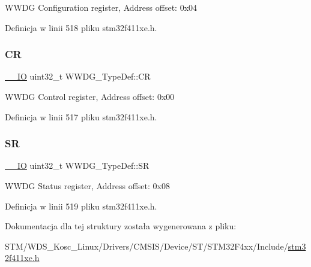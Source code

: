 W\+W\+DG Configuration register, Address offset\+: 0x04 

Definicja w linii 518 pliku stm32f411xe.\+h.

\mbox{\label{struct_w_w_d_g___type_def_a4caf530d45f7428c9700d9c0057135f8}} 
\subsubsection{\texorpdfstring{CR}{CR}}
{\footnotesize\ttfamily \hyperlink{core__sc300_8h_aec43007d9998a0a0e01faede4133d6be}{\+\_\+\+\_\+\+IO} uint32\+\_\+t W\+W\+D\+G\+\_\+\+Type\+Def\+::\+CR}

W\+W\+DG Control register, Address offset\+: 0x00 

Definicja w linii 517 pliku stm32f411xe.\+h.

\mbox{\label{struct_w_w_d_g___type_def_a15655cda4854cc794db1f27b3c0bba38}} 
\subsubsection{\texorpdfstring{SR}{SR}}
{\footnotesize\ttfamily \hyperlink{core__sc300_8h_aec43007d9998a0a0e01faede4133d6be}{\+\_\+\+\_\+\+IO} uint32\+\_\+t W\+W\+D\+G\+\_\+\+Type\+Def\+::\+SR}

W\+W\+DG Status register, Address offset\+: 0x08 

Definicja w linii 519 pliku stm32f411xe.\+h.



Dokumentacja dla tej struktury została wygenerowana z pliku\+:\begin{DoxyCompactItemize}
\item 
S\+T\+M/\+W\+D\+S\+\_\+\+Kosc\+\_\+\+Linux/\+Drivers/\+C\+M\+S\+I\+S/\+Device/\+S\+T/\+S\+T\+M32\+F4xx/\+Include/\hyperlink{stm32f411xe_8h}{stm32f411xe.\+h}\end{DoxyCompactItemize}
